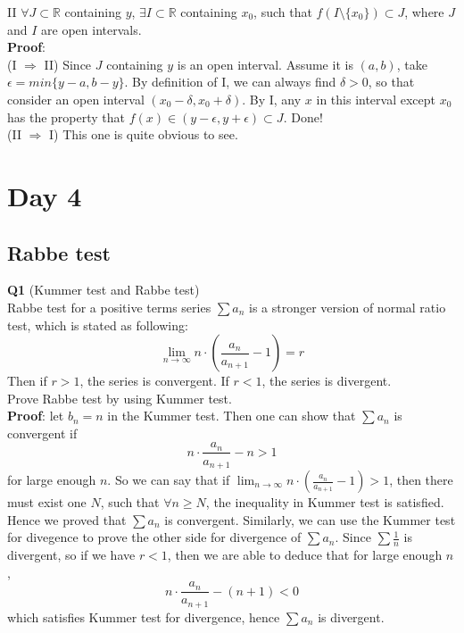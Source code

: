 \documentclass{article}
\begin{document}
II $\forall J \subset \mathbb{R}$ containing $y$, $\exists I \subset \mathbb{R}$ containing $x_0$, such that $f\left(I \setminus \{x_0\}\right) \subset J$, where $J$ and $I$ are open intervals.\\
\textbf{Proof}:\\
(I $\Longrightarrow$ II) Since $J$ containing $y$ is an open interval. Assume it is $\left(a,b\right)$, take $\epsilon = min\{y-a, b-y\}$. By definition
of I, we can always find $\delta > 0$, so that consider an open interval $\left(x_0-\delta, x_0+\delta\right)$. By I, any $x$ in this interval except $x_0$ has the property
that $f(x) \in \left(y-\epsilon, y+\epsilon\right) \subset J$. Done!\\
(II $\Longrightarrow$ I) This one is quite obvious to see.\\
\newpage
\section{Day 4}
\subsection{Rabbe test}
\textbf{Q1} (Kummer test and Rabbe test)\\
Rabbe test for a positive terms series $\sum a_n$ is a stronger version of normal ratio test, which is stated as following:\\
$$
\lim_{n \to \infty} n\cdot\left(\frac{a_n}{a_{n+1}}-1\right) = r
$$
Then if $r > 1$, the series is convergent. If $r<1$, the series is divergent.\\
Prove Rabbe test by using Kummer test.\\
\textbf{Proof}: let $b_n = n$ in the Kummer test. Then one can show that $\sum a_n$ is convergent if
$$
n \cdot \frac{a_n}{a_{n+1}} - n > 1
$$
for large enough $n$. So we can say that if $\lim_{n \to \infty} n\cdot\left(\frac{a_n}{a_{n+1}}-1\right) > 1$, then there must exist one $N$, 
such that $\forall n \geq N$, the inequality in Kummer test is satisfied. Hence we proved that $\sum a_n$ is convergent. Similarly, we can use the Kummer test for divegence to prove the other side for divergence of $\sum a_n$.
Since $\sum \frac{1}{n}$ is divergent, so if we have $r < 1$, then we are able to deduce that for large enough $n$,
$$
n \cdot \frac{a_n}{a_{n+1}} - (n+1) < 0
$$
which satisfies Kummer test for divergence, hence $\sum a_n$ is divergent.\\
\\
\\
\\
\\
\end{document}
